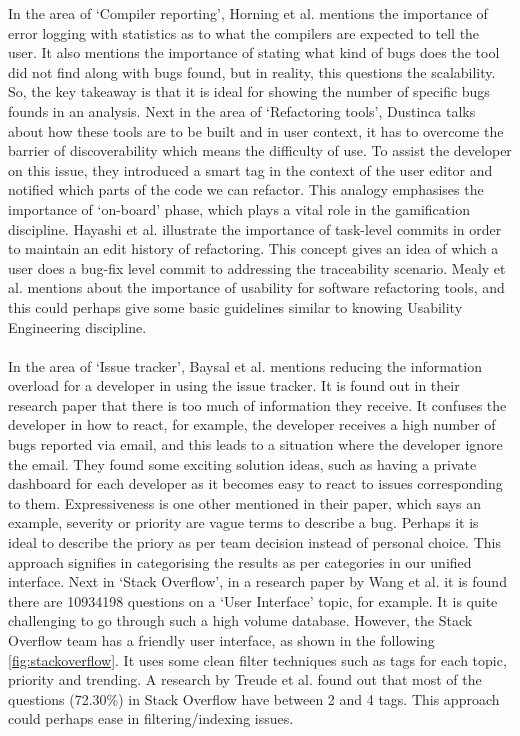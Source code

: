In the area of ‘Compiler reporting’, Horning et al. \cite{horning} mentions the importance of error logging with statistics as to what the compilers are expected to tell the user. It also mentions the importance of stating what kind of bugs does the tool did not find along with bugs found, but in reality, this questions the scalability. So, the key takeaway is that it is ideal for showing the number of specific bugs founds in an analysis. Next in the area of ‘Refactoring tools’, Dustinca \cite{dustinca} talks about how these tools are to be built and in user context, it has to overcome the barrier of discoverability which means the difficulty of use. To assist the developer on this issue, they introduced a smart tag in the context of the user editor and notified which parts of the code we can refactor. This analogy emphasises the importance of ‘on-board’ phase, which plays a vital role in the gamification \cite{gamify} discipline. Hayashi et al. \cite{Hayashi} illustrate the importance of task-level commits in order to maintain an edit history of refactoring. This concept gives an idea of which a user does a bug-fix level commit to addressing the traceability scenario. Mealy et al. \cite{Mealy} mentions about the importance of usability for software refactoring tools, and this could perhaps give some basic guidelines similar to knowing Usability Engineering \cite{usability} discipline. \\ \\

In the area of ‘Issue tracker’, Baysal et al. \cite{Baysal} mentions reducing the information overload for a developer in using the issue tracker. It is found out in their research paper that there is too much of information they receive. It confuses the developer in how to react, for example, the developer receives a high number of bugs reported via email, and this leads to a situation where the developer ignore the email. They found some exciting solution ideas, such as having a private dashboard for each developer as it becomes easy to react to issues corresponding to them. Expressiveness is one other mentioned in their paper, which says an example, severity or priority are vague terms to describe a bug. Perhaps it is ideal to describe the priory as per team decision instead of personal choice. This approach signifies in categorising the results as per categories in our unified interface. Next in ‘Stack Overflow’, in a research paper by Wang et al. \cite{stack} it is found there are 10934198 questions on a ‘User Interface’ topic, for example. It is quite challenging to go through such a high volume database. However, the Stack Overflow team has a friendly user interface, as shown in the following \autoref{fig:stackoverflow}. It uses some clean filter techniques such as tags for each topic, priority and trending. A research by Treude et al. \cite{Treude.2011} found out that most of the questions (72.30\%) in Stack Overflow have between 2 and 4 tags. This approach could perhaps ease in filtering/indexing issues. \\ \\

